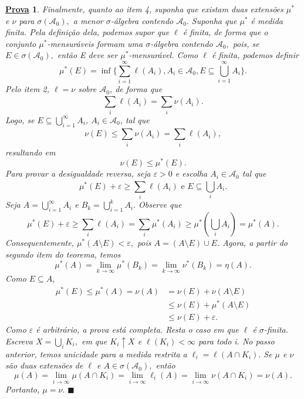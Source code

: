 \documentclass{article}
\newtheorem*{proof*}{\underline{Prova}}
\renewcommand\qedsymbol{$\blacksquare$}
\begin{document}
\begin{proof*}
   Finalmente, quanto ao item 4, suponha que existam duas extensões \(\mu ^{*}\) e \(\nu \) para \(\sigma (\mathcal{A}_{0}),\) a menor \(\sigma \)-álgebra contendo \(\mathcal{A}_{0}.\) Suponha que 
   \(\mu ^{*}\) é medida finita. Pela definição dela, podemos supor que \(\ell \) é finita, de forma que o conjunto \(\mu ^{*}\)-mensuráveis formam uma \(\sigma \)-álgebra contendo \(\mathcal{A}_{0},\) pois, se \(E \in \sigma (\mathcal{A}_{0}),\) então E deve ser \(\mu ^{*}\)-mensurável. 
   Como \(\ell \) é finita, podemos definir 
     \[
       \mu ^{*}(E) = \inf_{}\biggl\{\sum\limits_{i=1}^{\infty}\ell (A_{i}), A_{i}\in \mathcal{A}_{0}, E\subseteq \bigcup_{i=1}^{\infty}A_{i}\biggr\}.
     \]
    Pelo item 2, \(\ell = \nu\) sobre \(\mathcal{A}_{0}\), de forma que 
      \[
        \sum\limits_{i}^{}\ell (A_{i}) = \sum\limits_{i}^{}\nu(A_{i}).
      \]
    Logo, se \(E\subseteq \bigcup_{i=1}^{\infty}A_{i}\), \(A_{i}\in \mathcal{A}_{0}\), tal que 
      \[
        \nu(E) \leq \sum\limits_{i}^{}\nu(A_{i}) = \sum\limits_{i}^{}\ell (A_{i}),
      \]
    resultando em 
      \[
        \nu(E) \leq \mu ^{*}(E).
      \]
    Para provar a desigualdade reversa, seja \(\varepsilon > 0\) e escolha \(A_{i}\in \mathcal{A}_{0}\) tal que 
      \[
        \mu ^{*}(E) + \varepsilon  \geq \sum\limits_{i}^{}\ell (A_{i})\text{ e } E\subseteq \bigcup_{i}^{}A_{i}.
      \]
    Seja \(A = \bigcup_{i=1}^{\infty}A_{i}\) e \(B_{k} = \bigcup_{i=1}^{k}A_{i}.\) Observe que 
      \[
        \mu ^{*}(E) + \varepsilon  \geq \sum\limits_{i}^{}\ell (A_{i}) = \sum\limits_{i}^{}\mu ^{*}(A_{i}) \geq \mu ^{*}(\bigcup_{i}^{}A_{i}) = \mu ^{*}(A).
      \]
    Consequentemente, \(\mu ^{*}(A\setminus{E}) < \varepsilon ,\) pois \(A = (A\setminus{E})\cup E\). Agora, a partir do segundo item do teorema, temos 
      \[
        \mu ^{*}(A) = \lim_{k\to \infty}\mu ^{*}(B_{k}) = \lim_{k\to \infty}\nu^{*}(B_{k}) = \eta (A).
      \]
    Como \(E\subseteq A\), 
   \begin{align*}
     \mu ^{*}(E) \leq \mu ^{*}(A) = \nu(A) &=\nu(E) + \nu(A\setminus{E})\\ 
                                           &\leq \nu(E) + \mu ^{*}(A\setminus{E})\\ 
                                           &\leq \nu(E) + \varepsilon .
   \end{align*}
   Como \(\varepsilon \) é arbitrário, a prova está completa. Resta o caso em que \(\ell \) é \(\sigma \)-finita. Escreva \(X = \bigcup_{i}^{}K_{i}, \) em que \(K_{i}\uparrow X\) e 
   \(\ell (K_{i}) < \infty\)  para todo i. No passo anterior, temos unicidade para a medida restrita a \(\ell_{i} = \ell (A\cap K_{i}). \) Se \(\mu \) e \(\nu\) são duas extensões de \(\ell \) e \(A\in \sigma (\mathcal{A}_{0}),\) então 
     \[
       \mu (A) = \lim_{i\to \infty}\mu (A\cap K_{i}) = \lim_{i\to \infty}\ell_{i}(A) = \lim_{i\to \infty}\nu(A\cap K_{i}) = \nu(A).
     \]
    Portanto, \(\mu = \nu.\) \qedsymbol
\end{proof*}
\newpage
\end{document}
